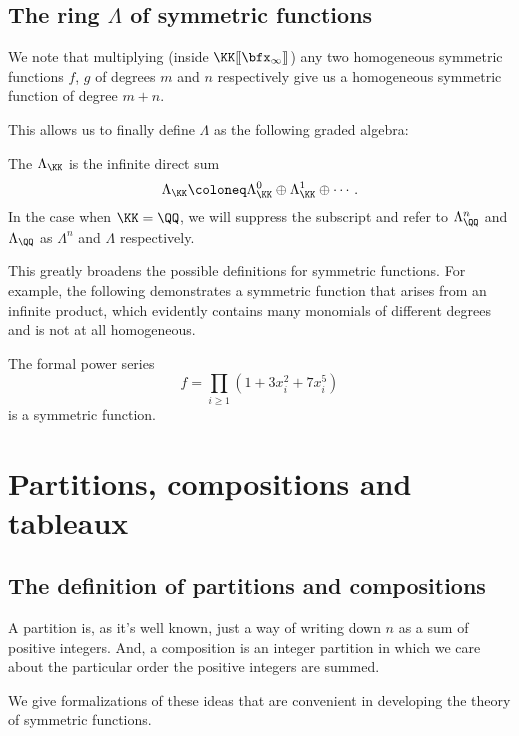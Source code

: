 \documentclass{article}
\newcommand{\fps}[2]{#1 [\kern-1.2pt[ {#2} ]\kern-1.2pt]}
\begin{document}
\subsection{The ring $\Lambda$ of symmetric functions}

We note that multiplying (inside $\fps{\KK}{\bfx_\infty}$) any two homogeneous symmetric functions $f$, $g$ of degrees $m$ and $n$ respectively give us a homogeneous symmetric function of degree $m+n$.

This allows us to finally define $\Lambda$ as the following graded algebra:

\begin{definition}
    The  $\Lambda_\KK$ is the infinite direct sum
    \[
        \Lambda_\KK \coloneq \Lambda_\KK^0 \oplus\Lambda_\KK^1 \oplus \cdots.
    \]
    In the case when $\KK = \QQ$, we will suppress the subscript and refer to $\Lambda_\QQ^n$ and $\Lambda_\QQ$ as $\Lambda^n$ and $\Lambda$ respectively.
\end{definition}

This greatly broadens the possible definitions for symmetric functions. 
For example, the following demonstrates a symmetric function that arises from an infinite product, which evidently contains many monomials of different degrees and is not at all homogeneous.

\begin{example}
    The formal power series 
    \[
        f = \prod_{i\geq1} (1 + 3x_i^2 + 7x_i^5)
    \]
    is a symmetric function.
\end{example}

\section{Partitions, compositions and tableaux}

\subsection{The definition of partitions and compositions}

A partition is, as it's well known, just a way of writing down $n$ as a sum of positive integers.
And, a composition is an integer partition in which we care about the particular order the positive integers are summed.

We give formalizations of these ideas that are convenient in developing the theory of symmetric functions.
\end{document}
